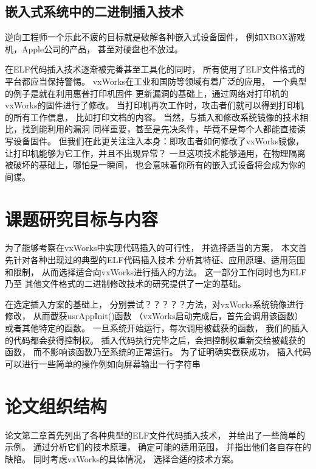 \subsection{嵌入式系统中的二进制插入技术}

逆向工程师一个乐此不疲的目标就是破解各种嵌入式设备固件，
例如XBOX游戏机，Apple公司的产品，
甚至对硬盘也不放过。


在ELF代码插入技术逐渐被完善甚至工具化的同时，
所有使用了ELF文件格式的平台都应当保持警惕。
vxWorks在工业和国防等领域有着广泛的应用，
一个典型的例子是\cite{printme}就在利用惠普打印机固件
更新漏洞的基础上，通过网络对打印机的vxWorks的固件进行了修改。
当打印机再次工作时，攻击者们就可以得到打印机的所有工作信息，
比如打印文档的内容。
当然，与插入和修改系统镜像的技术相比，找到能利用的漏洞
同样重要，甚至是先决条件，毕竟不是每个人都能直接读写设备固件。
但我们在此更关注注入本身：即攻击者如何修改了vxWorks镜像，
让打印机能够为它工作，并且不出现异常？
一旦这项技术能够通用，在物理隔离被破坏的基础上，哪怕是一瞬间，
也会意味着你所有的嵌入式设备将会成为你的间谍。

\section{课题研究目标与内容}

为了能够考察在vxWorks中实现代码插入的可行性，
并选择适当的方案，
本文首先针对各种出现过的典型的ELF代码插入技术
分析其特征、应用原理、适用范围和限制，
从而选择适合向vxWorks进行插入的方法。
这一部分工作同时也为ELF乃至
其他文件格式的二进制修改技术的研究提供了一定的基础。


在选定插入方案的基础上，
分别尝试？？？？？方法，对vxWorks系统镜像进行修改，
从而截获usrAppInit()函数
（vxWorks启动完成后，首先会调用该函数）
或者其他特定的函数。
一旦系统开始运行，每次调用被截获的函数，
我们的插入的代码都会获得控制权。
插入代码执行完毕之后，会把控制权重新交给被截获的函数，
而不影响该函数乃至系统的正常运行。
为了证明确实截获成功，
插入代码
可以进行一些简单的操作例如向屏幕输出一行字符串

\section{论文组织结构}

论文第二章首先列出了各种典型的ELF文件代码插入技术，
并给出了一些简单的示例。
通过分析它们的技术原理，
确定可能的适用范围，
并指出他们各自存在的缺陷。
同时考虑vxWorks的具体情况，
选择合适的技术方案。

